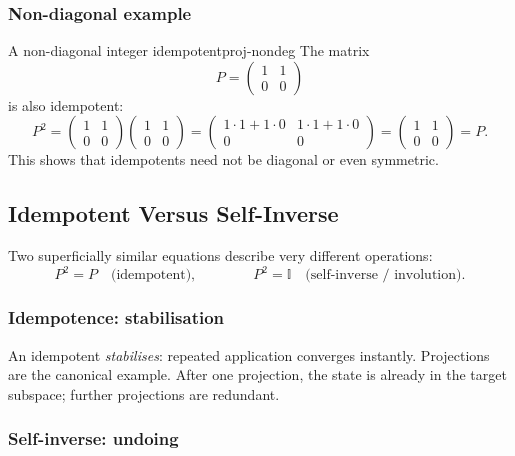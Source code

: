 \documentclass[11pt,a4paper]{article}
\newcommand{\id}{\mathbb{I}}
\begin{document}
\subsubsection{Non-diagonal example}

\begin{exm}{A non-diagonal integer idempotent}{proj-nondeg}
  The matrix
  \[
    P = \begin{pmatrix}1&1\\0&0\end{pmatrix}
  \]
  is also idempotent:
  \[
    P^2 =
    \begin{pmatrix}1&1\\0&0\end{pmatrix}
    \begin{pmatrix}1&1\\0&0\end{pmatrix}
    =
    \begin{pmatrix}1\cdot1+1\cdot0 & 1\cdot1+1\cdot0\\0&0\end{pmatrix}
    =
    \begin{pmatrix}1&1\\0&0\end{pmatrix} = P.
  \]
  This shows that idempotents need not be diagonal or even symmetric.
\end{exm}

\subsection{Idempotent Versus Self-Inverse}
\label{sec:idem-vs-inv}

Two superficially similar equations describe very different operations:
\[
  P^2 = P \quad\text{(idempotent)},
  \qquad\qquad
  P^2 = \id \quad\text{(self-inverse / involution)}.
\]

\subsubsection{Idempotence: stabilisation}

An idempotent \emph{stabilises}: repeated application converges instantly.
Projections are the canonical example.  After one projection, the state is
already in the target subspace; further projections are redundant.

\subsubsection{Self-inverse: undoing}
\end{document}
